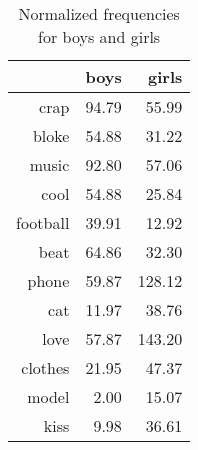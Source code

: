 \begin{table}[ht]
\begin{center}
\begin{tabular}{rrr}
  \hline
 & boys & girls \\ 
  \hline
crap & 94.79 & 55.99 \\ 
  bloke & 54.88 & 31.22 \\ 
  music & 92.80 & 57.06 \\ 
  cool & 54.88 & 25.84 \\ 
  football & 39.91 & 12.92 \\ 
  beat & 64.86 & 32.30 \\ 
  phone & 59.87 & 128.12 \\ 
  cat & 11.97 & 38.76 \\ 
  love & 57.87 & 143.20 \\ 
  clothes & 21.95 & 47.37 \\ 
  model & 2.00 & 15.07 \\ 
  kiss & 9.98 & 36.61 \\ 
   \hline
\end{tabular}
\caption{Normalized frequencies for boys and girls}
\label{tab:freq}
\end{center}
\end{table}